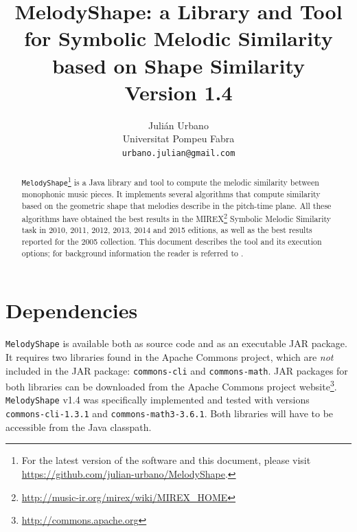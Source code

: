\documentclass[twoside]{article}
\begin{document}
\title{\textbf{MelodyShape: a Library and Tool for Symbolic Melodic Similarity based on Shape Similarity\\{\Large Version 1.4}}}
\author{Juli\'an Urbano\\Universitat Pompeu Fabra\\\texttt{urbano.julian@gmail.com}}
\maketitle

\sloppy 

\begin{abstract}
\noindent\texttt{MelodyShape}\footnote{For the latest version of the software and this document, please visit \url{https://github.com/julian-urbano/MelodyShape}.} is a Java library and tool to compute the melodic similarity between monophonic music pieces. It implements several algorithms that compute similarity based on the geometric shape that melodies describe in the pitch-time plane. All these algorithms have obtained the best results in the MIREX\footnote{\url{http://music-ir.org/mirex/wiki/MIREX_HOME}} Symbolic Melodic Similarity task in 2010, 2011, 2012, 2013, 2014 and 2015 editions, as well as the best results reported for the 2005 collection. This document describes the tool and its execution options; for background information the reader is referred to \cite{Urbano2011:shape}.
\end{abstract}

\section{Dependencies}

\texttt{MelodyShape} is available both as source code and as an executable JAR package. It requires two libraries found in the Apache Commons project, which are \emph{not} included in the JAR package: \texttt{commons-cli} and \texttt{commons-math}.
JAR packages for both libraries can be downloaded from the Apache Commons project website\footnote{\url{http://commons.apache.org}}. \texttt{MelodyShape} v1.4 was specifically implemented and tested with versions \texttt{commons-cli-1.3.1} and \texttt{commons-math3-3.6.1}.
Both libraries will have to be accessible from the Java classpath.
\end{document}
